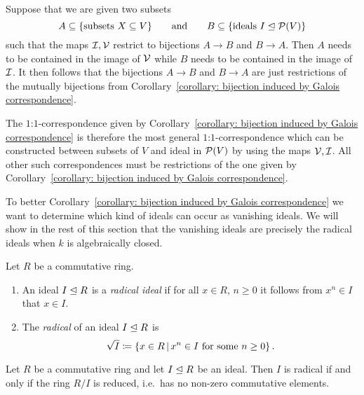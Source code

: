\begin{fluff}
 Suppose that we are given two subsets
  \[
              A
    \subseteq \{ \text{subsets $X \subseteq V$} \}
    \qquad\text{and}\qquad
              B
    \subseteq \{ \text{ideals $I \trianglelefteq \mathcal{P}(V)$} \}
  \]
  such that the maps $\mathcal{I}, \mathcal{V}$ restrict to bijections $A \to B$ and $B \to A$.
  Then $A$ needs to be contained in the image of $\mathcal{V}$ while $B$ needs to be contained in the image of $\mathcal{I}$.
  It then follows that the bijections $A \to B$ and $B \to A$ are just restrictions of the mutually bijections from Corollary~\ref{corollary: bijection induced by Galois correspondence}.
  
  The $1$:$1$-correspondence given by Corollary~\ref{corollary: bijection induced by Galois correspondence} is therefore the most general $1$:$1$-correspondence which can be constructed between subsets of $V$ and ideal in $\mathcal{P}(V)$ by using the maps $\mathcal{V}, \mathcal{I}$.
  All other such correspondences must be restrictions of the one given by Corollary~\ref{corollary: bijection induced by Galois correspondence}.
  
  To better Corollary~\ref{corollary: bijection induced by Galois correspondence} we want to determine which kind of ideals can occur as vanishing ideals.
  We will show in the rest of this section that the vanishing ideals are precisely the radical ideals when $k$ is algebraically closed.
\end{fluff}


\begin{definition}
  Let $R$ be a commutative ring.
  \begin{enumerate}
    \item
      An ideal $I \trianglelefteq R$ is a \emph{radical ideal} if for all $x \in R$, $n \geq 0$ it follows from $x^n \in I$ that $x \in I$.
    \item
      The \emph{radical} of an ideal $I \trianglelefteq R$ is
      \[
                  \rad{I}
        \defined  \{
                    x \in R
                  \suchthat
                    \text{$x^n \in I$ for some $n \geq 0$}
                  \} \,.
      \]
  \end{enumerate}
\end{definition}


\begin{lemma}
  Let $R$ be a commutative ring and let $I \trianglelefteq R$ be an ideal.
  Then $I$ is radical if and only if the ring $R/I$ is reduced, i.e.\ has no non-zero commutative elements.
\end{lemma}


